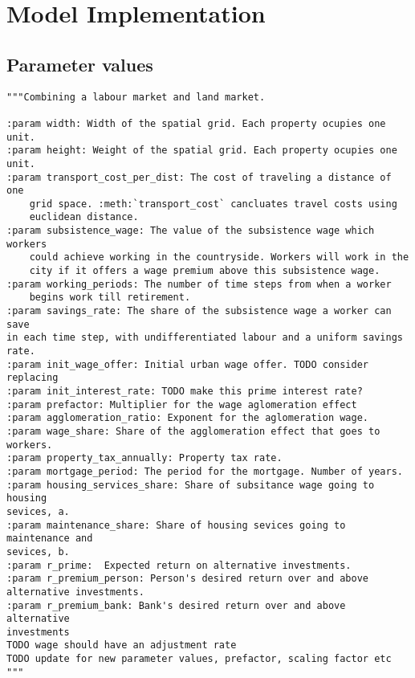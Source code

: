 \chapter[Model Implementation]{Model Implementation}
\label{appendix-model-implementation}


\section{Parameter values}

\begin{lstlisting}
"""Combining a labour market and land market.

:param width: Width of the spatial grid. Each property ocupies one unit.
:param height: Weight of the spatial grid. Each property ocupies one unit.
:param transport_cost_per_dist: The cost of traveling a distance of one
    grid space. :meth:`transport_cost` cancluates travel costs using
    euclidean distance.
:param subsistence_wage: The value of the subsistence wage which workers
    could achieve working in the countryside. Workers will work in the
    city if it offers a wage premium above this subsistence wage.
:param working_periods: The number of time steps from when a worker
    begins work till retirement.
:param savings_rate: The share of the subsistence wage a worker can save
in each time step, with undifferentiated labour and a uniform savings rate.
:param init_wage_offer: Initial urban wage offer. TODO consider replacing
:param init_interest_rate: TODO make this prime interest rate?
:param prefactor: Multiplier for the wage aglomeration effect 
:param agglomeration_ratio: Exponent for the aglomeration wage.
:param wage_share: Share of the agglomeration effect that goes to workers.
:param property_tax_annually: Property tax rate.
:param mortgage_period: The period for the mortgage. Number of years.
:param housing_services_share: Share of subsitance wage going to housing 
sevices, a.
:param maintenance_share: Share of housing sevices going to maintenance and 
sevices, b.
:param r_prime:  Expected return on alternative investments.
:param r_premium_person: Person's desired return over and above 
alternative investments.
:param r_premium_bank: Bank's desired return over and above alternative 
investments
TODO wage should have an adjustment rate
TODO update for new parameter values, prefactor, scaling factor etc
"""
\end{lstlisting}

